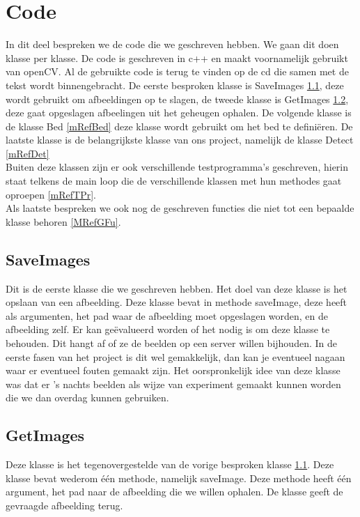 \section{Code}
\label{mrefCod}
In dit deel bespreken we de code die we geschreven hebben. We gaan dit doen klasse per klasse. De code is geschreven in c++ en maakt voornamelijk gebruikt van openCV. Al de gebruikte code is terug te vinden op de cd die samen met de tekst wordt binnengebracht. De eerste besproken klasse is SaveImages \ref{mRefSIm}, deze wordt gebruikt om afbeeldingen op te slagen, de tweede klasse is GetImages \ref{mRefGIm}, deze gaat opgeslagen afbeelingen uit het geheugen ophalen. De volgende klasse is de klasse Bed \ref{mRefBed} deze klasse wordt gebruikt om het bed te defini\"eren. De laatste klasse is de belangrijkste klasse van ons project, namelijk de klasse Detect \ref{mRefDet}\\ 
Buiten deze klassen zijn er ook verschillende testprogramma's geschreven, hierin staat telkens de main loop die de verschillende klassen met hun methodes gaat oproepen \ref{mRefTPr}.\\
Als laatste bespreken we ook nog de geschreven functies die niet tot een bepaalde klasse behoren \ref{MRefGFu}.

\subsection{SaveImages}
\label{mRefSIm}
Dit is de eerste klasse die we geschreven hebben. Het doel van deze klasse is het opslaan van een afbeelding. Deze klasse bevat in methode saveImage, deze heeft als argumenten, het pad waar de afbeelding moet opgeslagen worden, en de afbeelding zelf.  
Er kan ge\"evalueerd worden of het nodig is om deze klasse te behouden. Dit hangt af of ze de beelden op een server willen bijhouden. In de eerste fasen van het project is dit wel gemakkelijk, dan kan je eventueel nagaan waar er eventueel fouten gemaakt zijn. 
Het oorspronkelijk idee van deze klasse was dat er 's nachts beelden als wijze van experiment gemaakt kunnen worden die we dan overdag kunnen gebruiken.

\subsection{GetImages}
\label{mRefGIm}
Deze klasse is het tegenovergestelde van de vorige besproken klasse \ref{mRefSIm}. Deze klasse bevat wederom \'e\'en methode, namelijk saveImage. Deze methode heeft \'e\'en argument, het pad naar de afbeelding die we willen ophalen. De klasse geeft de gevraagde afbeelding terug.

